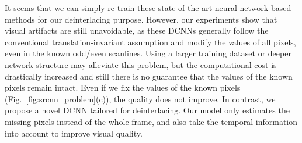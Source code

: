 It seems that we can simply re-train these state-of-the-art 
neural network based methods for our deinterlacing purpose. 
However, our experiments show that visual artifacts are still unavoidable, as 
these DCNNs generally follow the conventional translation-invariant assumption and
modify the values of all pixels, even in the known odd/even scanlines.  Using a larger
training dataset or deeper network structure may alleviate this problem, but the
computational cost is drastically increased and still there is no guarantee 
that the values of the known pixels remain intact. 
Even if we fix the values of the known pixels (Fig.~\ref{fig:srcnn_problem}(c)), 
the quality does not improve. 
In contrast, we propose a novel DCNN tailored for deinterlacing.
Our model only estimates the missing pixels instead of the whole frame, and also
take the temporal information into account to improve visual quality.

